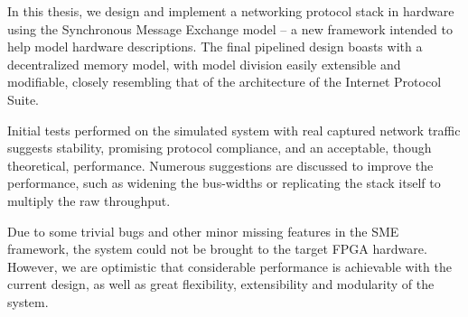 In this thesis, we design and implement a networking protocol stack in hardware
using the Synchronous Message Exchange model -- a new framework intended to
help model hardware descriptions.  The final pipelined design boasts with
a decentralized memory model, with model division easily extensible and
modifiable, closely resembling that of the architecture of the Internet
Protocol Suite.

Initial tests performed on the simulated system with real captured network
traffic suggests stability, promising protocol compliance, and an acceptable, though
theoretical, performance. Numerous suggestions are discussed to improve the performance,
such as widening the bus-widths or replicating the stack itself to multiply the
raw throughput.

Due to some trivial bugs and other minor missing features in the SME framework,
the system could not be brought to the target FPGA hardware. However, we are
optimistic that considerable performance is achievable with the current design,
as well as great flexibility, extensibility and modularity of the system.


